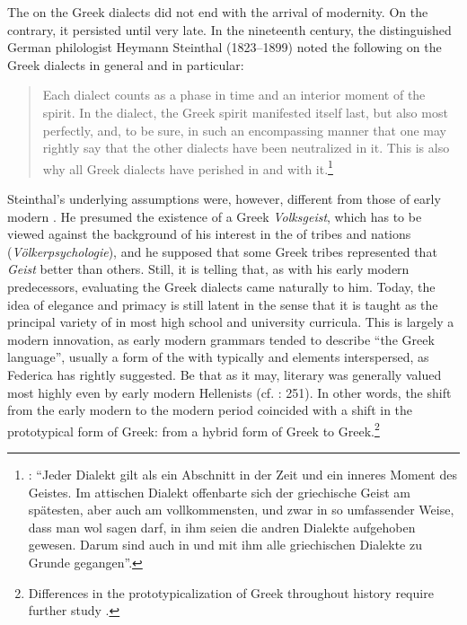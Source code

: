 The  on the Greek dialects did not end with the arrival of modernity. On the contrary, it persisted until very late. In the nineteenth century, the distinguished German philologist Heymann Steinthal (1823–1899) noted the following on the Greek dialects in general and  in particular:

\begin{quote}
Each dialect counts as a phase in time and an interior moment of the spirit. In the  dialect, the Greek spirit manifested itself last, but also most perfectly, and, to be sure, in such an encompassing manner that one may rightly say that the other dialects have been neutralized in it. This is also why all Greek dialects have perished in and with it.\footnote{\citet[9]{Steinthal1891}: “Jeder Dialekt gilt als ein Abschnitt in der Zeit und ein inneres Moment des Geistes. Im attischen Dialekt offenbarte sich der griechische Geist am spätesten, aber auch am vollkommensten, und zwar in so umfassender Weise, dass man wol sagen darf, in ihm seien die andren Dialekte aufgehoben gewesen. Darum sind auch in und mit ihm alle griechischen Dialekte zu Grunde gegangen”.}
\end{quote}

Steinthal’s underlying assumptions were, however, different from those of early modern . He presumed the existence of a Greek \textit{Volksgeist}, which has to be viewed against the background of his interest in the  of tribes and nations (\textit{Völkerpsychologie}), and he supposed that some Greek tribes represented that \textit{Geist} better than others. Still, it is telling that, as with his early modern predecessors, evaluating the Greek dialects came naturally to him. Today, the idea of  elegance and primacy is still latent in the sense that it is taught as the principal variety of  in most high school and university curricula. This is largely a modern innovation, as early modern grammars tended to describe “the Greek language”, usually a form of the  with typically  and  elements interspersed, as Federica \citet[123]{Ciccolella2008} has rightly suggested. Be that as it may, literary  was generally valued most highly even by early modern Hellenists (cf. \citealt{Roelcke2014}: 251). In other words, the shift from the early modern to the modern period coincided with a shift in the prototypical form of Greek: from a hybrid form of  Greek to  Greek.\footnote{Differences in the prototypicalization of Greek throughout history require further study \citep[105--106]{VanRooyFcb}.}

